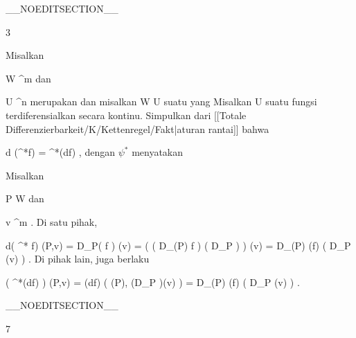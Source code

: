 __NOEDITSECTION__

{3}

{

Misalkan

\mavergleichskette
{\vergleichskette
{ W
}
{ \subseteq }{ \R^m
}
{  }{
}
{    }{
}
{   }{
}
}
{}{}{}
dan

\mavergleichskette
{\vergleichskette
{ U
}
{ \subseteq }{ \R^n
}
{  }{
}
{    }{
}
{   }{
}
}
{}{}{}
merupakan
dan misalkan
\maabbdisp {\psi} { W } { U
} {}
suatu
yang
Misalkan
 { U } {\R
} {}
suatu fungsi terdiferensialkan secara kontinu. Simpulkan dari
[[Totale Differenzierbarkeit/K/Kettenregel/Fakt|aturan rantai]]
bahwa

\mavergleichskettedisp
{\vergleichskette
{ d (\psi^*f)
}
{ =} { \psi^*(df)
}
{ } {
}
{ } {
}
{ } {
}
}
{}{}{,}
dengan $\psi^*$ menyatakan

}
{

Misalkan

\mavergleichskette
{\vergleichskette
{ P
}
{ \in }{  W
}
{  }{
}
{    }{
}
{   }{
}
}
{}{}{}
dan

\mavergleichskette
{\vergleichskette
{ v
}
{ \in }{  \R^m
}
{  }{
}
{    }{
}
{   }{
}
}
{}{}{.}
Di satu pihak,

\mavergleichskettedisp
{\vergleichskette
{ d( \psi^* f) (P,v)
}
{ =} { D_P( f \circ \psi) (v)
}
{ =} { \left(  \left(  D_{\psi(P)} f  \right)  \circ \left(  D_P  \psi  \right)  \right) (v)
}
{ =} { D_{\psi(P)} (f) \left(  D_P \psi(v)  \right)
}
{ } {
}
}
{}{}{.}
Di pihak lain, juga berlaku

\mavergleichskettedisp
{\vergleichskette
{ \left(  \psi^*(df)  \right) (P,v)
}
{ =} { (df) \left(  \psi(P), (D_P \psi )(v)  \right)
}
{ =} { D_{\psi(P)} (f) \left(  D_P \psi (v)  \right)
}
{ } {
}
{ } {
}
}
{}{}{.}

 }

__NOEDITSECTION__

{7}

